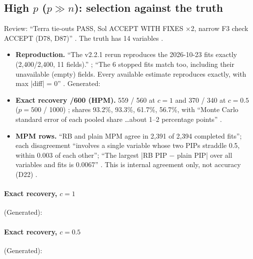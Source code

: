 \subsection{High \texorpdfstring{$p$}{p} (\texorpdfstring{$p\gg n$}{p >> n}): selection against the truth}\label{sec:emp-highp}

Review: ``Terra tie-outs PASS, Sol ACCEPT WITH FIXES ×2, narrow F3 check ACCEPT (D78, D87)'' . The
truth has 14 variables .

\begin{itemize}
\item {} \textbf{Reproduction.} ``The v2.2.1 rerun reproduces the 2026-10-23 fits exactly (2,400/2,400, 11 fields).''
; ``The 6 stopped fits match too, including their unavailable (empty) fields. Every available estimate
reproduces exactly, with max |diff| = 0'' . Generated:
\end{itemize}


\begin{itemize}
\item {} \textbf{Exact recovery /600 (HPM).} 559 / 560 at $c=1$ and 370 / 340 at $c=0.5$ ($p=500$ / 1000)
; shares 93.2\%, 93.3\%, 61.7\%, 56.7\%, with ``Monte Carlo standard error of each pooled share
\dots about 1–2 percentage points'' .
\item {} \textbf{MPM rows.} ``RB and plain MPM agree in 2,391 of 2,394 completed fits''; each disagreement ``involves a
single variable whose two PIPs straddle 0.5, within 0.003 of each other''; ``The largest |RB PIP − plain PIP| over all variables
and fits is 0.0067'' . This is internal agreement only, not
accuracy (D22) .
\end{itemize}

\paragraph{Exact recovery, $c=1$} (Generated):

\paragraph{Exact recovery, $c=0.5$} (Generated):

